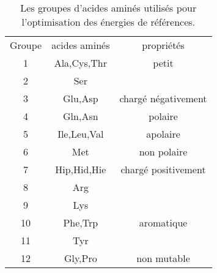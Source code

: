     \begin{table}[!htbp]
      \centering

      \begin{tabular}{ccc}

        \toprule
        Groupe & acides aminés & propriétés\\
        \cmidrule{1-3}

        1   & Ala,Cys,Thr & petit\\
        2   & Ser &\\
        \cmidrule{1-3}
        3   & Glu,Asp & chargé négativement\\
        \cmidrule{1-3}
        4   & Gln,Asn & polaire\\
        \cmidrule{1-3}
        5   & Ile,Leu,Val & apolaire\\
        \cmidrule{1-3}
        6   & Met & non polaire\\
        \cmidrule{1-3}
        7   & Hip,Hid,Hie & chargé positivement\\
        8   & Arg \\
        9   & Lys \\
        \cmidrule{1-3}
        10  & Phe,Trp & aromatique\\
        11  & Tyr \\
        \cmidrule{1-3}
        12  & Gly,Pro & non mutable\\
        \bottomrule


      \end{tabular}      
      \caption{Les groupes d'acides aminés utilisés pour l'optimisation des énergies de références.}
\label{tab:AA_groupes}      
    \end{table}



